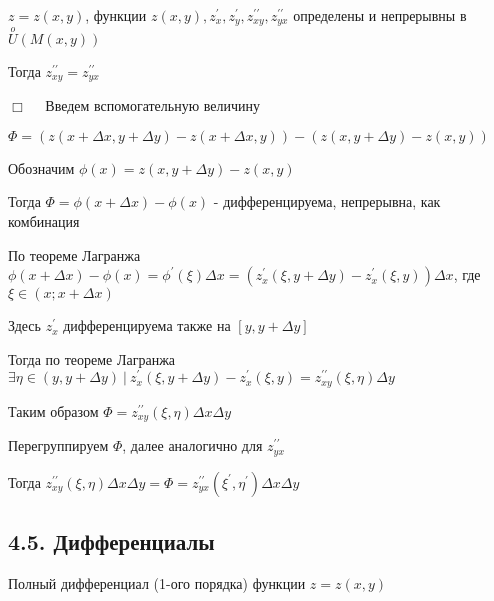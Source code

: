 \documentclass[12pt]{article}
\begin{document}
    \vspace{3mm}

    \hypertarget{equalityofsecondderivativesoffunctionoftwovariables}{}

    \Th $\displaystyle z = z(x, y)$, функции $\displaystyle z(x, y), z^\prime_x, z^\prime_y, z^{\prime\prime}_{xy}, z^{\prime\prime}_{yx}$ определены и непрерывны в $\displaystyle \stackrel{o}{U}(M(x, y))$

    Тогда $\displaystyle z^{\prime\prime}_{xy} = z^{\prime\prime}_{yx}$

    $\displaystyle \Box \quad$ Введем вспомогательную величину

    $\displaystyle \Phi = (z(x + \Delta x, y + \Delta y) - z(x + \Delta x, y)) - (z(x, y + \Delta y) - z(x, y))$

    Обозначим $\displaystyle \phi(x) = z(x, y + \Delta y) - z(x, y)$

    Тогда $\displaystyle \Phi = \phi(x + \Delta x) - \phi(x)$ - дифференцируема, непрерывна, как комбинация

    По теореме Лагранжа $\displaystyle \phi(x + \Delta x) - \phi(x) = \phi^\prime(\xi) \Delta x = (z^\prime_x(\xi, y + \Delta y) - z^\prime_x(\xi, y)) \Delta x$, где $\displaystyle \xi \in (x; x + \Delta x)$

    Здесь $\displaystyle z^\prime_x$ дифференцируема также на $\displaystyle [y, y + \Delta y]$


    Тогда по теореме Лагранжа $\displaystyle \exists \eta \in (y, y + \Delta y) \ | \ z^\prime_x(\xi, y + \Delta y) - z^\prime_x(\xi, y) = z^{\prime\prime}_{xy} (\xi, \eta) \Delta y$

    Таким образом $\displaystyle \Phi = z^{\prime\prime}_{xy} (\xi, \eta) \Delta x \Delta y$

    Перегруппируем $\displaystyle \Phi$, далее аналогично для $\displaystyle z^{\prime\prime}_{yx}$

    Тогда $\displaystyle z^{\prime\prime}_{xy} (\xi, \eta) \Delta x \Delta y = \Phi = z^{\prime\prime}_{yx} (\xi^\prime, \eta^\prime) \Delta x \Delta y$

    \vspace{8mm}

    \subsection{4.5. Дифференциалы}
    
    \hypertarget{completedifferentialoffunctionoftwovariables}{}
     Полный дифференциал (1-ого порядка) функции $\displaystyle z = z(x, y)$
\end{document}
